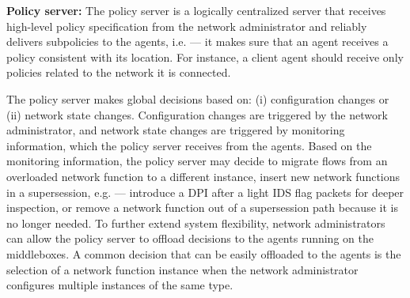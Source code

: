 




{\bf Policy  server:}   The  \system  policy  server is   a  logically
centralized server that receives  high-level policy specification from
the  network  administrator and reliably   delivers subpolicies to the
agents, i.e. --- it makes sure that an agent receives a policy consistent
with its location.  For instance,  a client agent should receive  only
policies related to the network it is connected.

The  policy server makes  global decisions based on: (i) configuration
changes  or (ii)   network state changes.    Configuration changes are
triggered  by the network administrator, and  network state changes are
triggered  by monitoring   information, which the  policy  server  receives  from the \system   agents. Based on the monitoring information, the policy server  may  decide to
migrate flows   from an overloaded   network function to   a different
instance, insert new network functions  in a supersession, e.g. --- introduce a DPI after  a light IDS flag packets
for deeper  inspection, or   remove a network
function  out of a  supersession path because it  is no longer needed.
To further extend system flexibility, network administrators can allow the policy server to offload decisions to the \system agents
running on the middleboxes.
A common decision that  can be easily offloaded to  the agents is  the
selection   of a     network   function instance   when  the   network
administrator configures multiple instances of the same type.

